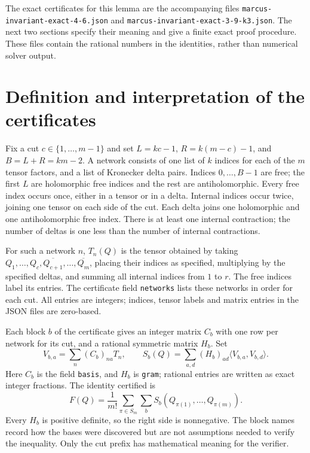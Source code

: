 \documentclass[11pt]{article}
\begin{document}
The exact certificates for this lemma are the accompanying files
\texttt{marcus-invariant-exact-4-6.json} and
\texttt{marcus-invariant-exact-3-9-k3.json}. The next two sections specify
their meaning and give a finite exact proof procedure. These files contain
the rational numbers in the identities, rather than numerical solver output.

\section{Definition and interpretation of the certificates}
Fix a cut $c\in\{1,\ldots,m-1\}$ and set
$L=kc-1$, $R=k(m-c)-1$, and $B=L+R=km-2$.
A network consists of one list of $k$ indices for each of the $m$ tensor
factors, and a list of Kronecker delta pairs. Indices $0,\ldots,B-1$ are free;
the first $L$ are holomorphic free indices and the rest are antiholomorphic.
Every free index occurs once, either in a tensor or in a delta. Internal
indices occur twice, joining one tensor on each side of the cut. Each delta
joins one holomorphic and one antiholomorphic free index. There is at least
one internal contraction; the number of deltas is one less than the number
of internal contractions.

For such a network $n$, $T_n(Q)$ is the tensor obtained by taking
$Q_1,\ldots,Q_c,\overline{Q_{c+1}},\ldots,\overline{Q_m}$, placing their
indices as specified, multiplying by the specified deltas, and summing all
internal indices from $1$ to $r$. The free indices label its entries.
The certificate field \texttt{networks} lists these networks in order for
each cut. All entries are integers; indices, tensor labels and matrix entries
in the JSON files are zero-based.

Each block $b$ of the certificate gives an integer matrix $C_b$ with one row
per network for its cut, and a rational symmetric matrix $H_b$. Set
\[
V_{b,a}=\sum_n(C_b)_{na}T_n,
\qquad S_b(Q)=\sum_{a,d}(H_b)_{ad}\langle V_{b,a},V_{b,d}\rangle.
\]
Here $C_b$ is the field \texttt{basis}, and $H_b$ is \texttt{gram}; rational
entries are written as exact integer fractions. The identity certified is
\begin{equation}\label{identity}
 F(Q)=\frac1{m!}\sum_{\pi\in S_m}\sum_b
 S_b(Q_{\pi(1)},\ldots,Q_{\pi(m)}).
\end{equation}
Every $H_b$ is positive definite, so the right side is nonnegative.
The block names record how the bases were discovered but are not assumptions
needed to verify the inequality. Only the cut prefix has mathematical
meaning for the verifier.
\end{document}
